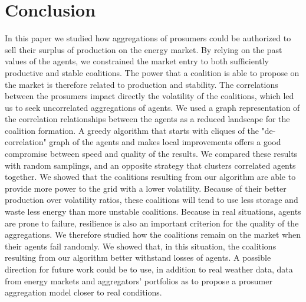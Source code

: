 \documentclass[journal]{IEEEtran}
\begin{document}
\section{Conclusion}
\label{sec:conclusion}

In this paper we studied how aggregations of prosumers could be authorized to sell their surplus of production on the energy market. By relying on the past values of the agents, we constrained the market entry to both sufficiently productive and stable coalitions. The power that a coalition is able to propose on the market is therefore related to production and stability. The correlations between the prosumers impact directly the volatility of the coalitions, which led us to seek uncorrelated aggregations of agents. We used a graph representation of the correlation relationships between the agents as a reduced landscape for the coalition formation. A greedy algorithm that starts with cliques of the "de-correlation" graph of the agents and makes local improvements offers a good compromise between speed and quality of the results. We compared these results with random samplings, and an opposite strategy that clusters correlated agents together. We showed that the coalitions resulting from our algorithm are able to provide more power to the grid with a lower volatility. Because of their better production over volatility ratios, these coalitions will tend to use less storage and waste less energy than more unstable coalitions. Because in real situations, agents are prone to failure, resilience is also an important criterion for the quality of the aggregations. We therefore studied how the coalitions remain on the market when their agents fail randomly. We showed that, in this situation, the coalitions resulting from our algorithm better withstand losses of agents. A possible direction for future work could be to use, in addition to real weather data, data from energy markets and aggregators' portfolios as to propose a prosumer aggregation model closer to real conditions.

%
%

  

\end{document}
